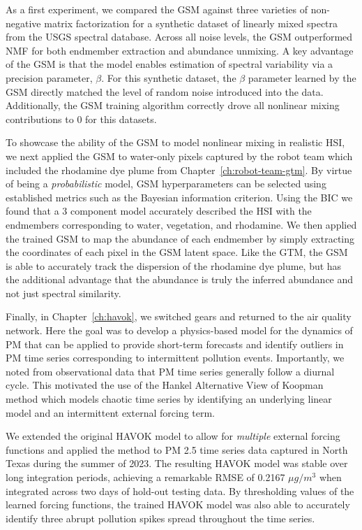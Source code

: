 As a first experiment, we compared the GSM against three varieties of
non-negative matrix factorization for a synthetic dataset of linearly mixed
spectra from the USGS spectral database. Across all noise levels, the GSM
outperformed NMF for both endmember extraction and abundance unmixing. A key
advantage of the GSM is that the model enables estimation of spectral
variability via a precision parameter, $\beta$. For this synthetic dataset, the
$\beta$ parameter learned by the GSM directly matched the level of random noise
introduced into the data.  Additionally, the GSM training algorithm correctly
drove all nonlinear mixing contributions to $0$ for this datasets.

To showcase the ability of the GSM to model nonlinear mixing in realistic HSI,
we next applied the GSM to water-only pixels captured by the robot team which
included the rhodamine dye plume from Chapter~\ref{ch:robot-team-gtm}.
By virtue of being a \textit{probabilistic} model, GSM hyperparameters can be
selected using established metrics such as the Bayesian information criterion.
Using the BIC  we found that a 3 component model accurately described the HSI
with the endmembers corresponding to water, vegetation, and rhodamine. We then
applied the trained GSM to map the abundance of each endmember by simply
extracting the coordinates of each pixel in the GSM latent space. Like the GTM,
the GSM is able to accurately track the dispersion of the rhodamine dye plume,
but has the additional advantage that the abundance is truly the inferred
abundance and not just spectral similarity.


Finally, in Chapter~\ref{ch:havok}, we switched gears and returned to the air
quality network. Here the goal was to develop a physics-based model for the
dynamics of PM that can be applied to provide short-term forecasts and identify
outliers in PM time series corresponding to intermittent pollution events.
Importantly, we noted from observational data that PM time series generally
follow a diurnal cycle. This motivated the use of the Hankel Alternative View of
Koopman method which models chaotic time series by identifying an underlying linear
model and an intermittent external forcing term.

We extended the original HAVOK model to allow for \textit{multiple} external forcing
functions and applied the method to PM 2.5 time series data captured in North
Texas during the summer of 2023. The resulting HAVOK model was stable over long
integration periods, achieving a remarkable RMSE of 0.2167 $\mu g/m^3$ when
integrated across two days of hold-out testing data. By thresholding values of
the learned forcing functions, the trained HAVOK model was also able to
accurately identify three abrupt pollution spikes spread throughout the time
series.

